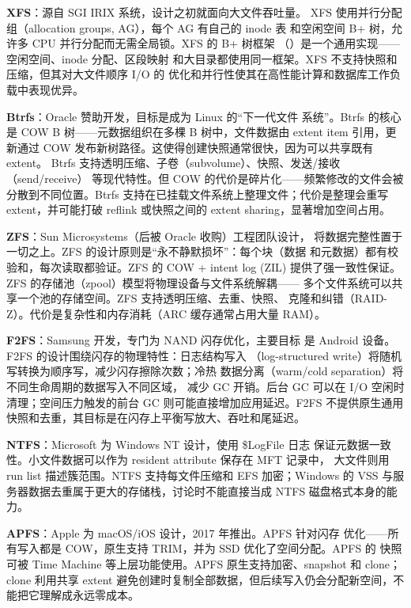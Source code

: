 \begin{filesystemlayout}
\noindent\textbf{XFS}：源自 SGI IRIX 系统，设计之初就面向大文件吞吐量。
XFS 使用并行分配组（allocation groups, AG），每个 AG 有自己的 inode 表
和空闲空间 B+ 树，允许多 CPU 并行分配而无需全局锁。XFS 的 B+ 树框架
（）是一个通用实现——空闲空间、inode 分配、区段映射
和大目录都使用同一框架。XFS 不支持快照和压缩，但其对大文件顺序 I/O 的
优化和并行性使其在高性能计算和数据库工作负载中表现优异。

\noindent\textbf{Btrfs}：Oracle 赞助开发，目标是成为 Linux 的``下一代文件
系统''。Btrfs 的核心是 COW B 树——元数据组织在多棵 B 树中，文件数据由 extent item 引用，更新通过 COW 发布新树路径。这使得创建快照通常很快，因为可以共享既有 extent。
Btrfs 支持透明压缩、子卷（subvolume）、快照、发送/接收（send/receive）
等现代特性。但 COW 的代价是碎片化——频繁修改的文件会被分散到不同位置。Btrfs 支持在已挂载文件系统上整理文件；代价是整理会重写 extent，并可能打破 reflink 或快照之间的 extent sharing，显著增加空间占用。

\noindent\textbf{ZFS}：Sun Microsystems（后被 Oracle 收购）工程团队设计，
将数据完整性置于一切之上。ZFS 的设计原则是``永不静默损坏''：每个块（数据
和元数据）都有校验和，每次读取都验证。ZFS 的 COW + intent log (ZIL)
提供了强一致性保证。ZFS 的存储池（zpool）模型将物理设备与文件系统解耦——
多个文件系统可以共享一个池的存储空间。ZFS 支持透明压缩、去重、快照、
克隆和纠错（RAID-Z）。代价是复杂性和内存消耗（ARC 缓存通常占用大量 RAM）。

\noindent\textbf{F2FS}：Samsung 开发，专门为 NAND 闪存优化，主要目标
是 Android 设备。F2FS 的设计围绕闪存的物理特性：日志结构写入
（log-structured write）将随机写转换为顺序写，减少闪存擦除次数；冷热
数据分离（warm/cold separation）将不同生命周期的数据写入不同区域，
减少 GC 开销。后台 GC 可以在 I/O 空闲时清理；空间压力触发的前台 GC 则可能直接增加应用延迟。F2FS 不提供原生通用快照和去重，其目标是在闪存上平衡写放大、吞吐和尾延迟。

\noindent\textbf{NTFS}：Microsoft 为 Windows NT 设计，使用 \$LogFile 日志
保证元数据一致性。小文件数据可以作为 resident attribute 保存在 MFT 记录中，
大文件则用 run list 描述簇范围。NTFS 支持每文件压缩和 EFS 加密；Windows 的
VSS 与服务器数据去重属于更大的存储栈，讨论时不能直接当成 NTFS 磁盘格式本身的能力。

\noindent\textbf{APFS}：Apple 为 macOS/iOS 设计，2017 年推出。APFS 针对闪存
优化——所有写入都是 COW，原生支持 TRIM，并为 SSD 优化了空间分配。APFS 的
快照可被 Time Machine 等上层功能使用。APFS 原生支持加密、snapshot 和 clone；
clone 利用共享 extent 避免创建时复制全部数据，但后续写入仍会分配新空间，不能把它理解成永远零成本。


\end{filesystemlayout}
